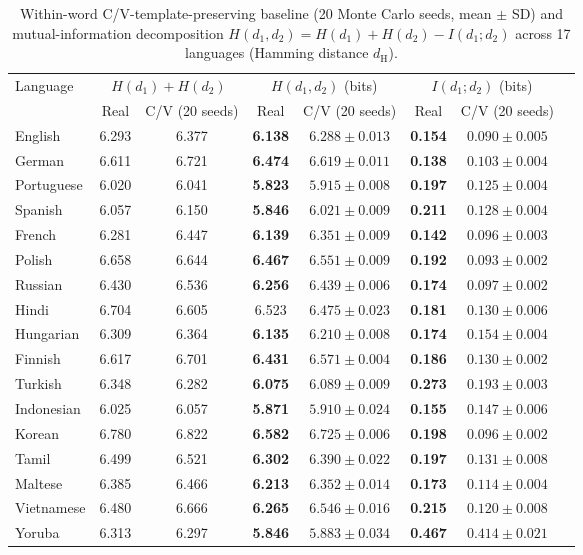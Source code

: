 \documentclass[11pt,a4paper,leqno]{article}
\begin{document}
\begin{table}[htbp]
\caption{Within-word C/V-template-preserving baseline (20 Monte Carlo seeds, mean $\pm$ SD) and mutual-information decomposition $H(d_1, d_2) = H(d_1) + H(d_2) - I(d_1; d_2)$ across 17 languages (Hamming distance $d_{\text{H}}$).}
\centering\footnotesize
\begin{tabular}{lccccccc}
\toprule
Language & \multicolumn{2}{c}{$H(d_1)+H(d_2)$} & \multicolumn{2}{c}{$H(d_1, d_2)$ (bits)} & \multicolumn{2}{c}{$I(d_1; d_2)$ (bits)} \\
\cmidrule(lr){2-3} \cmidrule(lr){4-5} \cmidrule(lr){6-7}
 & Real & C/V (20 seeds) & Real & C/V (20 seeds) & Real & C/V (20 seeds) \\
\midrule
English    & 6.293 & 6.377 & \textbf{6.138} & $6.288 \pm 0.013$ & \textbf{0.154} & $0.090 \pm 0.005$ \\
German     & 6.611 & 6.721 & \textbf{6.474} & $6.619 \pm 0.011$ & \textbf{0.138} & $0.103 \pm 0.004$ \\
Portuguese & 6.020 & 6.041 & \textbf{5.823} & $5.915 \pm 0.008$ & \textbf{0.197} & $0.125 \pm 0.004$ \\
Spanish    & 6.057 & 6.150 & \textbf{5.846} & $6.021 \pm 0.009$ & \textbf{0.211} & $0.128 \pm 0.004$ \\
French     & 6.281 & 6.447 & \textbf{6.139} & $6.351 \pm 0.009$ & \textbf{0.142} & $0.096 \pm 0.003$ \\
Polish     & 6.658 & 6.644 & \textbf{6.467} & $6.551 \pm 0.009$ & \textbf{0.192} & $0.093 \pm 0.002$ \\
Russian    & 6.430 & 6.536 & \textbf{6.256} & $6.439 \pm 0.006$ & \textbf{0.174} & $0.097 \pm 0.002$ \\
Hindi      & 6.704 & 6.605 & 6.523 & $\mathbf{6.475 \pm 0.023}$ & \textbf{0.181} & $0.130 \pm 0.006$ \\
Hungarian  & 6.309 & 6.364 & \textbf{6.135} & $6.210 \pm 0.008$ & \textbf{0.174} & $0.154 \pm 0.004$ \\
Finnish    & 6.617 & 6.701 & \textbf{6.431} & $6.571 \pm 0.004$ & \textbf{0.186} & $0.130 \pm 0.002$ \\
Turkish    & 6.348 & 6.282 & \textbf{6.075} & $6.089 \pm 0.009$ & \textbf{0.273} & $0.193 \pm 0.003$ \\
Indonesian & 6.025 & 6.057 & \textbf{5.871} & $5.910 \pm 0.024$ & \textbf{0.155} & $0.147 \pm 0.006$ \\
Korean     & 6.780 & 6.822 & \textbf{6.582} & $6.725 \pm 0.006$ & \textbf{0.198} & $0.096 \pm 0.002$ \\
Tamil      & 6.499 & 6.521 & \textbf{6.302} & $6.390 \pm 0.022$ & \textbf{0.197} & $0.131 \pm 0.008$ \\
Maltese    & 6.385 & 6.466 & \textbf{6.213} & $6.352 \pm 0.014$ & \textbf{0.173} & $0.114 \pm 0.004$ \\
Vietnamese & 6.480 & 6.666 & \textbf{6.265} & $6.546 \pm 0.016$ & \textbf{0.215} & $0.120 \pm 0.008$ \\
Yoruba     & 6.313 & 6.297 & \textbf{5.846} & $5.883 \pm 0.034$ & \textbf{0.467} & $0.414 \pm 0.021$ \\
\bottomrule
\end{tabular}
\label{tab:cv_decomp}
\end{table}
\end{document}
